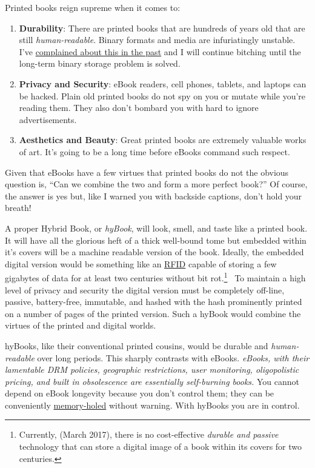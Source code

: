 \noindent Printed books reign supreme when it comes to:

\begin{enumerate}
\def\labelenumi{\arabic{enumi}.}
\item
  \textbf{Durability}: There are printed books that are hundreds of
  years old that are still \emph{human-readable}. Binary formats and
  media are infuriatingly unstable. I've
  \href{https://analyzethedatanotthedrivel.org/2010/12/06/soon-we-will-all-be-software-archeologists/}{complained
  about this in the past} and I will continue bitching until the
  long-term binary storage problem is solved.
\item
  \textbf{Privacy and Security}: eBook readers, cell phones, tablets,
  and laptops can be hacked. Plain old printed books do not spy on you
  or mutate while you're reading them. They also don't bombard you with
  hard to ignore advertisements.
\item
  \textbf{Aesthetics and Beauty}: Great printed books are extremely
  valuable works of art. It's going to be a long time before eBooks
  command such respect.
\end{enumerate}

Given that eBooks have a few virtues that printed books do not the
obvious question is, ``Can we combine the two and form a more perfect
book?'' Of course, the answer is yes but, like I warned you with
backside captions, don't hold your breath!

A proper Hybrid Book, or \emph{hyBook}, will look, smell, and taste like
a printed book. It will have all the glorious heft of a thick well-bound
tome but embedded within it's covers will be a machine readable version
of the book. Ideally, the embedded digital version would be something
like an
\href{https://en.wikipedia.org/wiki/Radio-frequency_identification}{RFID}
capable of storing a few gigabytes of data for at least two centuries
without bit rot.\footnote{Currently, (March 2017), there is no cost-effective \emph{durable and
passive} technology that can store a digital image of a book within
its covers for two centuries.}\ %
  To maintain
a high level of privacy and security the digital version must be
completely off-line, passive, battery-free, immutable, and hashed with
the hash prominently printed on a number of pages of the printed
version. Such a hyBook would combine the virtues of the printed and
digital worlds.

hyBooks, like their conventional printed cousins, would be durable and
\emph{human-readable} over long periods. This sharply contrasts with
eBooks. \emph{eBooks, with their lamentable DRM policies, geographic
restrictions, user monitoring, oligopolistic pricing, and built in
obsolescence are essentially self-burning books.} You cannot depend on
eBook longevity because you don't control them; they can be conveniently
\href{https://en.wikipedia.org/wiki/Memory_hole}{memory-holed} without
warning. With hyBooks you are in control.

